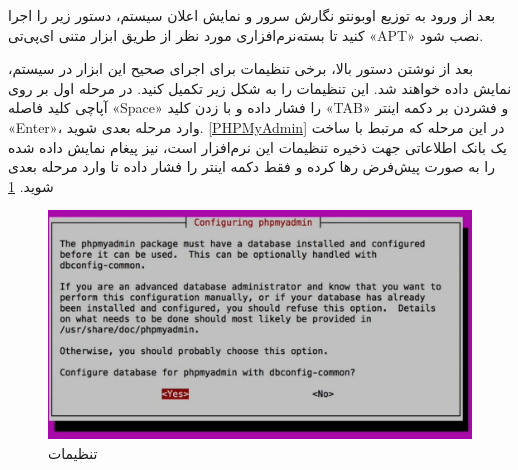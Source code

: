 \begin{latin}  
    
\end{latin}

بعد از ورود به  توزیع اوبونتو نگارش سرور و نمایش اعلان سیستم، دستور زیر را اجرا کنید تا بسته‌نرم‌افزاری مورد نظر از طریق ابزار متنی ای‌پی‌تی «APT» نصب شود.
\begin{latin}  
    
\end{latin}
بعد از نوشتن دستور بالا، برخی تنظیمات برای اجرای صحیح این ابزار در سیستم، نمایش داده خواهند شد. این تنظیمات را به شکل زیر تکمیل کنید. در مرحله اول بر روی آپاچی کلید فاصله «Space» را فشار داده و با زدن کلید «TAB» و فشردن بر دکمه اینتر «Enter»، وارد مرحله بعدی شوید.
\ref{PHPMyAdmin}
در این مرحله که مرتبط با ساخت یک بانک اطلاعاتی جهت ذخیره تنظیمات این نرم‌افزار است، نیز پیغام نمایش داده شده را به صورت پیش‌فرض رها کرده و فقط دکمه اینتر را فشار داده تا وارد مرحله بعدی شوید.
\ref{PHPMyAdmin2}
\begin{figure}
    \includegraphics[width=.9\textwidth ,height=.45\textwidth]{Pic/PHPADMIN2}
    \caption{ تنظیمات 
    }
    \label{PHPMyAdmin2}
\end{figure}

